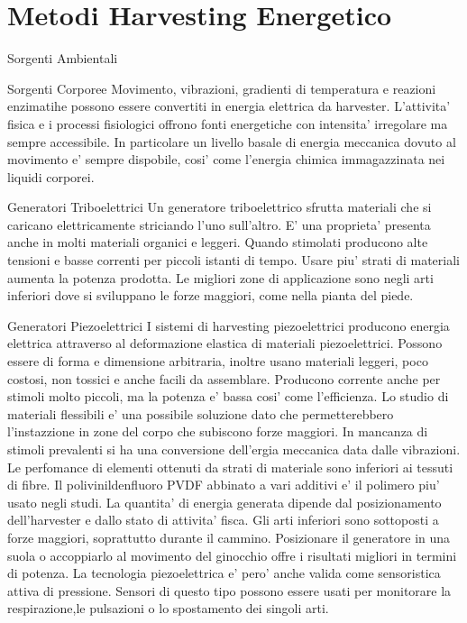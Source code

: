 \chapter{Metodi Harvesting Energetico}
\begin{multicols}{2}

\begin{section}{Sorgenti Ambientali}
   
\end{section}

\begin{section}{Sorgenti Corporee}
   Movimento, vibrazioni, gradienti di temperatura e reazioni enzimatihe possono essere convertiti in energia elettrica da harvester. L'attivita' fisica e i processi fisiologici offrono fonti energetiche con intensita' irregolare ma sempre accessibile. In particolare un livello basale di energia meccanica dovuto al movimento e' sempre dispobile, cosi' come l'energia chimica immagazzinata nei liquidi corporei.
   
   \begin{subsection}{Generatori Triboelettrici}
    Un generatore triboelettrico sfrutta materiali che si caricano elettricamente striciando l'uno sull'altro. E' una proprieta' presenta anche in molti materiali organici e leggeri. Quando stimolati producono alte tensioni e basse correnti per piccoli istanti di tempo. Usare piu' strati di materiali aumenta la potenza prodotta. Le migliori zone di applicazione sono negli arti inferiori dove si sviluppano le forze maggiori, come nella pianta del piede.
   \end{subsection}

   \begin{subsection}{Generatori Piezoelettrici}
    I sistemi di harvesting piezoelettrici producono energia elettrica attraverso al deformazione elastica di materiali piezoelettrici. Possono essere di forma e dimensione arbitraria, inoltre usano materiali leggeri, poco costosi, non tossici e anche facili da assemblare. Producono corrente anche per stimoli molto piccoli, ma la potenza e' bassa cosi' come l'efficienza. Lo studio di materiali flessibili e' una possibile soluzione dato che permetterebbero l'instazzione in zone del corpo che subiscono forze maggiori. In mancanza di stimoli prevalenti si ha una conversione dell'ergia meccanica data dalle vibrazioni. Le perfomance di elementi ottenuti da strati di materiale sono inferiori ai tessuti di fibre. Il polivinildenfluoro PVDF abbinato a vari additivi e' il polimero piu' usato negli studi. La quantita' di energia generata dipende dal posizionamento dell'harvester e dallo stato di attivita' fisca. Gli arti inferiori sono sottoposti a forze maggiori, soprattutto durante il cammino. Posizionare il generatore in una suola o accoppiarlo al movimento del ginocchio offre i risultati migliori in termini di potenza. La tecnologia piezoelettrica e' pero' anche valida come sensoristica attiva di pressione. Sensori di questo tipo possono essere usati per monitorare la respirazione,le pulsazioni o lo spostamento dei singoli arti.
   \end{subsection}


\end{section}
\end{multicols}
